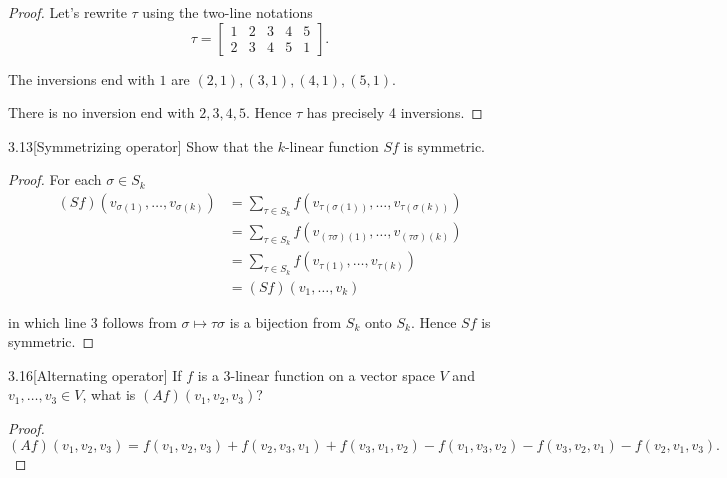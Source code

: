 \begin{proof}
	Let's rewrite \( \tau \) using the two-line notations
	\[
		\tau = \begin{bmatrix}
			1 & 2 & 3 & 4 & 5 \\
			2 & 3 & 4 & 5 & 1
		\end{bmatrix}.
	\]

	The inversions end with \( 1 \) are \( (2,1), (3,1), (4,1), (5,1) \).

	There is no inversion end with \( 2, 3, 4, 5 \). Hence \( \tau \) has precisely 4 inversions.
\end{proof}

\begin{exercise}{3.13}[Symmetrizing operator]
	Show that the \( k \)-linear function \( Sf \) is symmetric.
\end{exercise}

\begin{proof}
	For each \( \sigma \in S_{k} \)
	\begingroup
	\allowdisplaybreaks%
	\begin{align*}
		(Sf)(v_{\sigma(1)}, \ldots, v_{\sigma(k)}) & = \sum_{\tau \in S_{k}} f(v_{\tau(\sigma(1))}, \ldots, v_{\tau(\sigma(k))}) \\
		                                           & = \sum_{\tau \in S_{k}} f(v_{(\tau\sigma)(1)}, \ldots, v_{(\tau\sigma)(k)}) \\
		                                           & = \sum_{\tau \in S_{k}} f(v_{\tau(1)}, \ldots, v_{\tau(k)})                 \\
		                                           & = (Sf)(v_{1}, \ldots, v_{k})
	\end{align*}
	\endgroup

	in which line 3 follows from \( \sigma \mapsto \tau\sigma \) is a bijection from \( S_{k} \) onto \( S_{k} \). Hence \( Sf \) is symmetric.
\end{proof}

\begin{exercise}{3.16}[Alternating operator]
	If \( f \) is a 3-linear function on a vector space \( V \) and \( v_{1}, \ldots, v_{3} \in V \), what is \( (Af)(v_{1}, v_{2}, v_{3}) \)?
\end{exercise}

\begin{proof}
	\( (Af)(v_{1}, v_{2}, v_{3}) = f(v_{1}, v_{2}, v_{3}) + f(v_{2}, v_{3}, v_{1}) + f(v_{3}, v_{1}, v_{2}) - f(v_{1}, v_{3}, v_{2}) - f(v_{3}, v_{2}, v_{1}) - f(v_{2}, v_{1}, v_{3}). \)
\end{proof}

